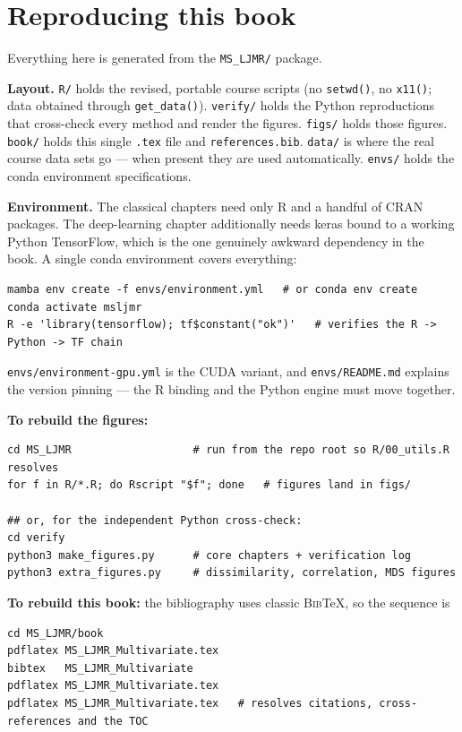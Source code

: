 \documentclass[11pt,oneside]{book}
\newcommand{\code}[1]{\texttt{#1}}
\newcommand{\R}{\textsf{R}}
\newcommand{\pkg}[1]{\textsf{#1}}
\begin{document}
\appendix
\chapter{Reproducing this book}
Everything here is generated from the \code{MS\_LJMR/} package.

\textbf{Layout.}
\code{R/} holds the revised, portable course scripts (no \code{setwd()}, no \code{x11()};
data obtained through \code{get\_data()}). \code{verify/} holds the Python reproductions
that cross-check every method and render the figures. \code{figs/} holds those figures.
\code{book/} holds this single \code{.tex} file and \code{references.bib}. \code{data/} is
where the real course data sets go — when present they are used automatically.
\code{envs/} holds the conda environment specifications.

\textbf{Environment.} The classical chapters need only \R{} and a handful of CRAN packages.
The deep-learning chapter additionally needs \pkg{keras} bound to a working Python
TensorFlow, which is the one genuinely awkward dependency in the book. A single conda
environment covers everything:

\begin{lstlisting}
mamba env create -f envs/environment.yml   # or conda env create
conda activate msljmr
R -e 'library(tensorflow); tf$constant("ok")'   # verifies the R -> Python -> TF chain
\end{lstlisting}

\code{envs/environment-gpu.yml} is the CUDA variant, and \code{envs/README.md} explains the
version pinning — the R binding and the Python engine must move together.

\textbf{To rebuild the figures:}
\begin{lstlisting}
cd MS_LJMR                   # run from the repo root so R/00_utils.R resolves
for f in R/*.R; do Rscript "$f"; done   # figures land in figs/

## or, for the independent Python cross-check:
cd verify
python3 make_figures.py      # core chapters + verification log
python3 extra_figures.py     # dissimilarity, correlation, MDS figures
\end{lstlisting}

\textbf{To rebuild this book:} the bibliography uses classic \textsc{Bib}\TeX{}, so the
sequence is

\begin{lstlisting}
cd MS_LJMR/book
pdflatex MS_LJMR_Multivariate.tex
bibtex   MS_LJMR_Multivariate
pdflatex MS_LJMR_Multivariate.tex
pdflatex MS_LJMR_Multivariate.tex   # resolves citations, cross-references and the TOC
\end{lstlisting}
\end{document}
